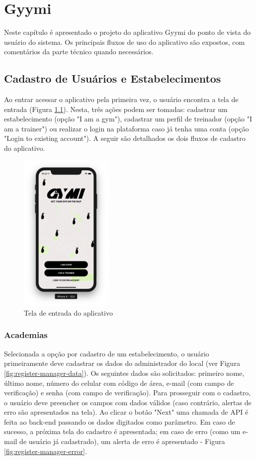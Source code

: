 \chapter{Gyymi}
Neste capítulo é apresentado o projeto do aplicativo Gyymi do ponto de vista do usuário do sistema. Os principais fluxos de uso do aplicativo são expostos, com comentários da parte técnico quando necessários.

\section{Cadastro de Usuários e Estabelecimentos}
Ao entrar acessar o aplicativo pela primeira vez, o usuário encontra a tela de entrada (Figura \ref{fig:landing}). Nesta, três ações podem ser tomadas: cadastrar um estabelecimento (opção "I am a gym"), cadastrar um perfil de treinador (opção "I am a trainer") ou realizar o login na plataforma caso já tenha uma conta (opção "Login to existing account"). A seguir são detalhados os dois fluxos de cadastro do aplicativo.
\begin{figure}[h]
    \centering
    \includegraphics[width=0.4\textwidth]{pfc/figuras/landing.png}
    \caption{Tela de entrada do aplicativo}
    \label{fig:landing}
\end{figure}

\subsection{Academias} \label{sec:register-gym}
Selecionada a opção por cadastro de um estabelecimento, o usuário primeiramente deve cadastrar os dados do administrador do local (ver Figura \ref{fig:register-manager-data}). Os seguintes dados são solicitados: primeiro nome, último nome, número do celular com código de área, e-mail (com campo de verificação) e senha (com campo de verificação). Para prosseguir com o cadastro, o usuário deve preencher os campos com dados válidos (caso contrário, alertas de erro são apresentados na tela). Ao clicar o botão "Next" uma chamada de API é feita ao back-end passando os dados digitados como parâmetro. Em caso de sucesso, a próxima tela do cadastro é apresentada; em caso de erro (como um e-mail de usuário já cadastrado), um alerta de erro é apresentado - Figura \ref{fig:register-manager-error}.

